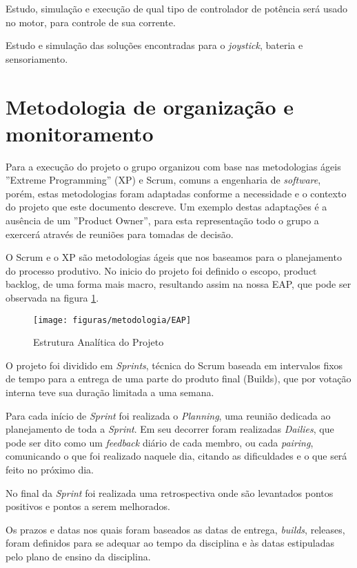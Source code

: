 	Estudo, simulação e execução de qual tipo de controlador de potência será usado no motor, para controle de sua corrente.

	Estudo e simulação das soluções encontradas para o \textit{joystick}, bateria e sensoriamento.

\section{Metodologia de organização e monitoramento}

Para a execução do projeto o grupo organizou com base nas metodologias ágeis ''Extreme Programming'' (XP) e Scrum, comuns a engenharia de \textit{software}, porém, estas metodologias foram adaptadas conforme a necessidade e o contexto do projeto que este documento descreve. Um exemplo destas adaptações é a ausência de um ''Product Owner'', para esta representação todo o grupo a exercerá através de reuniões para tomadas de decisão.

O Scrum e o XP são metodologias ágeis que nos baseamos para o planejamento do processo produtivo. No inicio do projeto foi definido o escopo, product backlog, de uma forma mais macro, resultando assim na nossa EAP, que pode ser observada na figura \ref{fig:eap}.

\begin{figure}[!htb]
\centering
  \texttt{[image: figuras/metodologia/EAP]}
\caption{Estrutura Analítica do Projeto}
\label{fig:eap}
\end{figure}

O projeto foi dividido em \textit{Sprints}, técnica do Scrum baseada em intervalos fixos de tempo para a entrega de uma parte do produto final (Builds), que por votação interna teve sua duração limitada a uma semana.

Para cada início de \textit{Sprint} foi realizada o \textit{Planning}, uma reunião dedicada ao planejamento de toda a \textit{Sprint}. Em seu decorrer foram realizadas \textit{Dailies}, que pode ser dito como um \textit{feedback} diário de cada membro, ou cada \textit{pairing}, comunicando o que foi realizado naquele dia, citando as dificuldades e o que será feito no próximo dia.

No final da \textit{Sprint} foi realizada uma retrospectiva onde são levantados pontos positivos e pontos a serem melhorados.

Os prazos e datas nos quais foram baseados as datas de entrega, \textit{builds}, releases, foram definidos para se adequar ao tempo da disciplina e às datas estipuladas pelo plano de ensino da disciplina.

